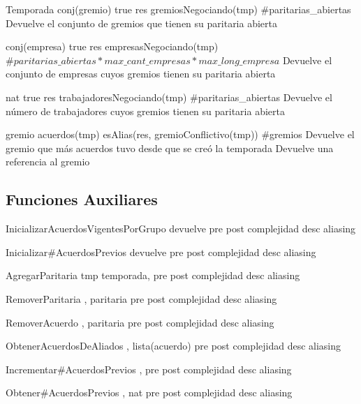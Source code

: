 \begin{interfaz}{Temporada}
{}{conj(gremio)}
{true}
{res \igobs gremiosNegociando(tmp)}
{\#paritarias\_abiertas}
{Devuelve el conjunto de gremios que tienen su paritaria abierta }
{}

{}{conj(empresa)}
{true}
{res \igobs empresasNegociando(tmp)}
{\ensuremath{\#paritarias\_abiertas * max\_cant\_empresas * max\_long\_empresa }}
{Devuelve el conjunto de empresas cuyos gremios tienen su paritaria abierta}
{}

{}{nat}
{true}
{res \igobs trabajadoresNegociando(tmp)}
{\#paritarias\_abiertas}
{Devuelve el n\'umero de trabajadores cuyos gremios tienen su paritaria abierta}
{}

{}
{gremio}
{\emptyset \neq acuerdos(tmp)}
{ esAlias(res, gremioConflictivo(tmp))}
{\#gremios}
{Devuelve el gremio que m\'as acuerdos tuvo desde que se cre\'o la temporada }
{Devuelve una referencia al gremio}

\subsection{Funciones Auxiliares}

\operacion
{InicializarAcuerdosVigentesPorGrupo}
{}
{devuelve}
{pre}
{post}
{complejidad}
{desc}
{aliasing}


\operacion
{Inicializar\#AcuerdosPrevios}
{}
{devuelve}
{pre}
{post}
{complejidad}
{desc}
{aliasing}


\operacion
{AgregarParitaria}
{
{tmp}
{temporada}, }
{}
{pre}
{post}
{complejidad}
{desc}
{aliasing}


\operacion
{RemoverParitaria}
{, }
{paritaria}
{pre}
{post}
{complejidad}
{desc}
{aliasing}


\operacion
{RemoverAcuerdo}
{, }
{paritaria}
{pre}
{post}
{complejidad}
{desc}
{aliasing}


\operacion
{ObtenerAcuerdosDeAliados}
{, }
{lista(acuerdo)}
{pre}
{post}
{complejidad}
{desc}
{aliasing}

\operacion
{Incrementar\#AcuerdosPrevios}
{, }
{}
{pre}
{post}
{complejidad}
{desc}
{aliasing}

\operacion
{Obtener\#AcuerdosPrevios}
{, }
{nat}
{pre}
{post}
{complejidad}
{desc}
{aliasing}

\end{interfaz}